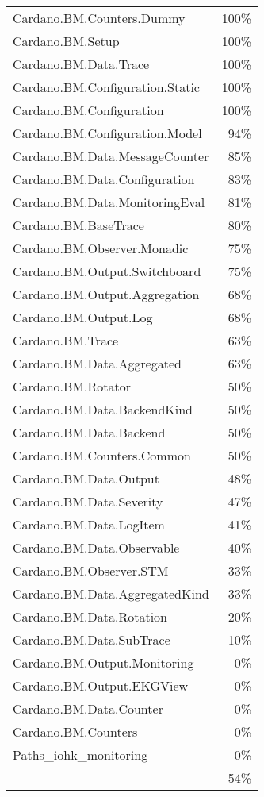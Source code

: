 \begin{tabular}{l r}
   Cardano.BM.Counters.Dummy & 100\% \\
   Cardano.BM.Setup & 100\% \\
   Cardano.BM.Data.Trace & 100\% \\
   Cardano.BM.Configuration.Static & 100\% \\
   Cardano.BM.Configuration & 100\% \\
   Cardano.BM.Configuration.Model & 94\% \\
   Cardano.BM.Data.MessageCounter & 85\% \\
   Cardano.BM.Data.Configuration & 83\% \\
   Cardano.BM.Data.MonitoringEval & 81\% \\
   Cardano.BM.BaseTrace & 80\% \\
   Cardano.BM.Observer.Monadic & 75\% \\
   Cardano.BM.Output.Switchboard & 75\% \\
   Cardano.BM.Output.Aggregation & 68\% \\
   Cardano.BM.Output.Log & 68\% \\
   Cardano.BM.Trace & 63\% \\
   Cardano.BM.Data.Aggregated & 63\% \\
   Cardano.BM.Rotator & 50\% \\
   Cardano.BM.Data.BackendKind & 50\% \\
   Cardano.BM.Data.Backend & 50\% \\
   Cardano.BM.Counters.Common & 50\% \\
   Cardano.BM.Data.Output & 48\% \\
   Cardano.BM.Data.Severity & 47\% \\
   Cardano.BM.Data.LogItem & 41\% \\
   Cardano.BM.Data.Observable & 40\% \\
   Cardano.BM.Observer.STM & 33\% \\
   Cardano.BM.Data.AggregatedKind & 33\% \\
   Cardano.BM.Data.Rotation & 20\% \\
   Cardano.BM.Data.SubTrace & 10\% \\
   Cardano.BM.Output.Monitoring & 0\% \\
   Cardano.BM.Output.EKGView & 0\% \\
   Cardano.BM.Data.Counter & 0\% \\
   Cardano.BM.Counters & 0\% \\
   Paths\_iohk\_monitoring & 0\% \\
    & 54\% \\
\end{tabular}
